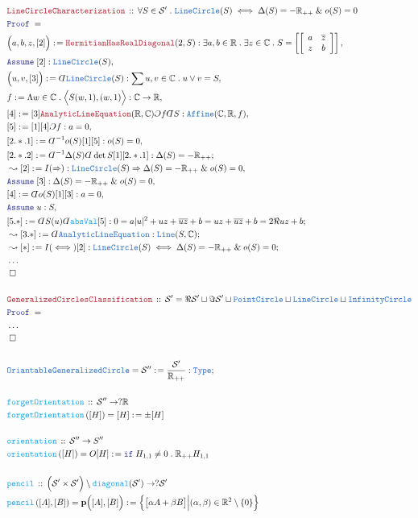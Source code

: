 \documentclass[12pt]{scrartcl}
\newcommand{\TYPE}[1]{\textcolor{NavyBlue}{\mathtt{#1}}}
\newcommand{\FUNC}[1]{\textcolor{Cerulean}{\mathtt{#1}}}
\newcommand{\LOGIC}[1]{\textcolor{Blue}{\mathtt{#1}}}
\newcommand{\THM}[1]{\textcolor{Maroon}{\mathtt{#1}}}
\renewcommand{\.}{\; . \;}
\newcommand{\de}{: \kern 0.1pc =}
\newcommand{\If}{\LOGIC{if} \;}
\newcommand{\Act}[1]{\left( #1 \right)}
\newcommand{\Theorem}[2]{& \THM{#1} \, :: \, #2 \\ & \Proof = \\ }
\newcommand{\DeclareFunc}[2]{& \FUNC{#1} \, :: \, #2 \\}
\newcommand{\DefineNamedFunc}[4]{&  \FUNC{#1}\Act{#2} = #3 \de #4 \\}
\newcommand{\Page}[1]{ \begin{align*} #1 \end{align*}   }
\newcommand{ \bd }{ \ByDef }
\newcommand{\NoProof}{ & \ldots \\ \EndProof}
\renewcommand{\And}{\; \& \;}
\newcommand{\Imply}{\Rightarrow}
\newcommand{\Type}{\TYPE{Type}}
\newcommand{\Reals}{\mathbb{R} }
\newcommand{\Complex}{\mathbb{C}}
\newcommand{\Say}[3]{& #1 \de #2 : #3, \\}
\newcommand{\Conclude}[3]{& #1 \de #2 : #3; \\}
\newcommand{\Derive}[3]{& \leadsto #1 \de #2 : #3, \\}
\newcommand{\DeriveConclude}[3]{& \leadsto #1 \de #2 : #3 ; \\}
\newcommand{\Assume}[2]{& \LOGIC{Assume} \; #1 : #2, \\}
\newcommand{\QED}{\; \square}
\newcommand{\EndProof}{& \QED \\}
\newcommand{\ByDef}{\rotatebox[origin=c]{-180}{$D$}}%
\newcommand{\ByConstr}{\rotatebox[origin=c]{-180}{$C$}}%
\newcommand{\Proof}{\LOGIC{Proof} \; }
\renewcommand{\S}{\mathcal{S}}
\newcommand{\p}{\mathbf{p}}
\begin{document}
\Page{
	\Theorem{LineCircleCharacterization}
	{
		\forall S \in \S' \.  \TYPE{LineCircle}(S) \iff   \Delta(S) = -\Reals_{++} \And o(S) = 0
	}
	\Say{\Big( a,b,z, [2] \Big)}{\THM{HermitianHasRealDiagonal}(2,S)}
	{
		\exists a,b \in \Reals \.
		\exists z \in \Complex \.
		S = \left[ \left[      
		\begin{array}{cc}
			a & \overline{z} \\
			z &     b
		\end{array}
		\right] \right]
	}
	\Assume{[2]}
	{
		\TYPE{LineCircle}(S)
	}
	\Say{\Big(u,v,[3]\Big)}{\bd \TYPE{LineCircle}(S)}{ \sum u,v \in \Complex \.  u \vee v = S}
	\Say{f}{\Lambda w \in \Complex \.  \Big\langle S(w,1), (w,1) \Big\rangle }{\Complex \to \Reals}
	\Say{[4]}{[3]\THM{AnalyticLineEquation}(\Reals,\Complex)\ByConstr f \bd S}{\TYPE{Affine}(\Complex,\Reals, f)}
	\Say{[5]}{[1][4] \ByConstr f}{ a = 0 }
	\Say{[2.*.1]}{\bd^{-1} o(S) [1][5]}{o(S) = 0}
	\Conclude{[2.*.2]}{\bd^{-1} \Delta(S) \bd \det S [1][2.*.1]}{\Delta(S) = -\Reals_{++}}
	\Derive{[2]}{I(\Imply)}{\TYPE{LineCircle}(S) \Imply   \Delta(S) = -\Reals_{++} \And o(S) = 0}
	\Assume{[3]}{ \Delta(S) = -\Reals_{++} \And o(S) = 0 }
	\Say{[4]}{\bd o(S)[1][3]}{a = 0}
	\Assume{u}{S}
	\Conclude{[5.*]}{ \bd S (u)  \bd \FUNC{absVal} [5]  }
	{
		0 = 
		a|u|^2  +  u  z  +  \overline{ u z } +  b =      
		 u  z  +  \overline{ u z } +  b  = 
		2\Re u z    + b 
	}
	\DeriveConclude{[3.*]}{\bd \TYPE{AnalyticLineEquation}}{\TYPE{Line}(S,\Complex)}
	\DeriveConclude{[*]}{I(\iff)[2]}{ \TYPE{LineCircle}(S) \iff   \Delta(S) = -\Reals_{++} \And o(S) = 0  }
	\NoProof
	\\
	\Theorem{GeneralizedCirclesClassification}
	{
		\S' = \Re \S' \sqcup \Im \S' \sqcup \TYPE{PointCircle} \sqcup \TYPE{LineCircle} \sqcup \TYPE{InfinityCircle} 
	}
	\NoProof
	\\
	\Conclude{\TYPE{OriantableGeneralizedCircle} = \S''}{\frac{\S'}{\Reals_{++}}}{\Type}
	\\
	\DeclareFunc{forgetOrientation}{\S'' \to ?\Reals}
	\DefineNamedFunc{forgetOrientation}{[H]}{[H]}{\pm [H]}
	\\
	\DeclareFunc{orientation}{\S'' \to S''}
	\DefineNamedFunc{orientation}{[H]}{O[H]}{\If H_{1,1} \neq 0 \. \Reals_{++} H_{1,1} } 
	\\
	\DeclareFunc{pencil}{ \Big(\S' \times \S'\Big) \setminus \FUNC{diagonal}(\S') \to ?\S' }
	\DefineNamedFunc{pencil}{[A],[B]}{\p\Big([A],[B]\Big)}{\Big\{ \big[ \alpha A + \beta B \big] \Big|  (\alpha,\beta) \in \Reals^2 \setminus \{0\}     \Big\}  }
	\\
}
\end{document}
